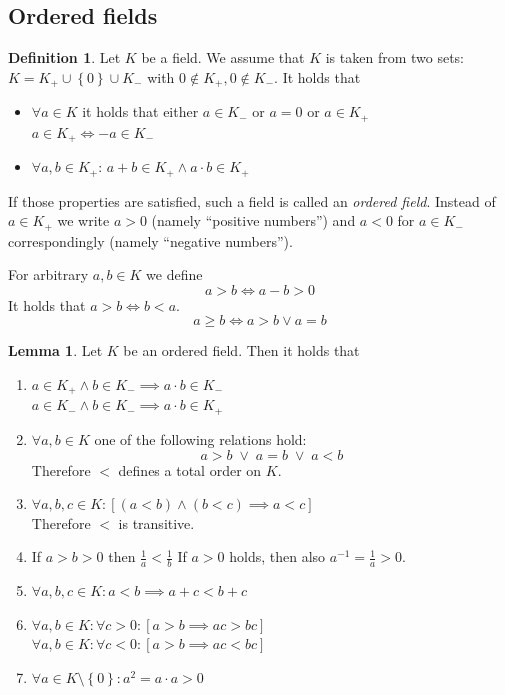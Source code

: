 \documentclass[a4paper,landscape,twocolumn]{article}
\theoremstyle{definition}
\newtheorem{defi}{Definition}
\newtheorem{lemma}{Lemma}
\newcommand\set[1]{\left\{#1\right\}}
\begin{document}
\subsection{Ordered fields}
\begin{defi}
  Let $K$ be a field. We assume that $K$ is taken from two sets: $K = K_+ \cup \set{0} \cup K_-$
  with $0 \not\in K_+, 0 \not\in K_-$. It holds that
  \begin{itemize}
    \item $\forall a \in K$ it holds that either $a \in K_-$ or $a = 0$ or $a \in K_+$ \\
          $a \in K_+ \iff -a \in K_-$
    \item $\forall a, b \in K_+$: $a + b \in K_+ \land a \cdot b \in K_+$
  \end{itemize}
  If those properties are satisfied, such a field is called an \emph{ordered field}.
  Instead of $a \in K_+$ we write $a > 0$ (namely \enquote{positive numbers})
  and $a < 0$ for $a \in K_-$ correspondingly (namely \enquote{negative numbers}).

  For arbitrary $a, b \in K$ we define
  \[ a > b \iff a - b > 0 \]
  It holds that $a > b \iff b < a$.
  \[ a \geq b \iff a > b \lor a = b \]
\end{defi}

\begin{lemma}
  Let $K$ be an ordered field. Then it holds that
  \begin{enumerate}
    \item $a \in K_+ \land b \in K_- \implies a \cdot b \in K_-$ \\
          $a \in K_- \land b \in K_- \implies a \cdot b \in K_+$
    \item $\forall a, b \in K$ one of the following relations hold:
          \[ a > b \;\lor\; a = b \;\lor\; a < b \]
          Therefore $<$ defines a total order on $K$.
    \item $\forall a, b, c \in K: \left[(a < b) \land (b < c) \implies a < c\right]$ \\
          Therefore $<$ is transitive.
    \item If $a > b > 0$ then $\frac1a < \frac1b$
          If $a > 0$ holds, then also $a^{-1} = \frac1a > 0$.
    \item $\forall a, b, c \in K: a < b \implies a + c < b + c$
    \item $\forall a, b \in K: \forall c > 0: \left[a > b \implies ac > bc\right]$ \\
          $\forall a, b \in K: \forall c < 0: \left[a > b \implies ac < bc\right]$
    \item $\forall a \in K \setminus \set{0}: a^2 = a \cdot a > 0$
  \end{enumerate}
\end{lemma}
\end{document}

